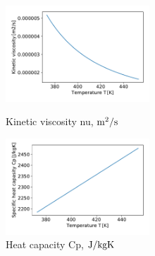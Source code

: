 \documentclass[conference]{IEEEtran}
\begin{document}
\begin{figure}[h]
\vspace{1zh}
\begin{minipage}{0.48\linewidth}
 \includegraphics[width=0.48\textwidth,natwidth=200,natheight=220]{fig/kinetic_viscosity.pdf}
 \vspace{-1zh}
 \caption{Kinetic viscosity nu, $\rm m^{2}/s$}\label{kinetic_viscosity}
\end{minipage}
\hfill
\begin{minipage}{0.48\linewidth}
 \includegraphics[width=0.48\textwidth,natwidth=190,natheight=210]{fig/heat_capacity.pdf}
 \vspace{-1.5zh}
 \caption{Heat capacity Cp, $\rm J/kgK$}\label{heat_capacity}
\end{minipage}
\vspace{2zh}
\end{figure}
\end{document}
